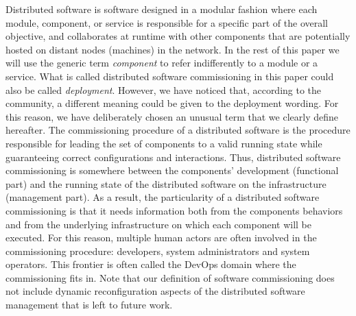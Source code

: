 Distributed software is software designed in a modular fashion
where each module, component, or service is responsible for a
specific part of the overall objective, and collaborates at runtime
with other components that are potentially hosted on distant nodes
(\ie machines) in the network. In the rest of this paper we will
use the generic term \emph{component} to refer
indifferently to a module or a service.
%
What is called distributed software commissioning in this paper could
also be called \emph{deployment}. However, we have noticed that,
according to the community, a different meaning could be given to the
deployment wording. For this reason, we have deliberately chosen an
unusual term that we clearly define hereafter.
%
The commissioning procedure of a distributed software is the procedure
responsible for leading the set of components to a valid running state
while guaranteeing correct configurations and interactions. Thus,
distributed software commissioning is somewhere between the
components' development (functional part) and the running state of the
distributed software on the infrastructure (management part). As a
result, the particularity of a distributed software commissioning is
that it needs information both from the components behaviors and from
the underlying infrastructure on which each component will be
executed. For this reason, multiple human actors are often involved in
the commissioning procedure: developers, system administrators and
system operators. This frontier is often called the DevOps domain
where the commissioning fits in. Note that our definition of software
commissioning does not include dynamic reconfiguration aspects of the
distributed software management that is left to future work.

